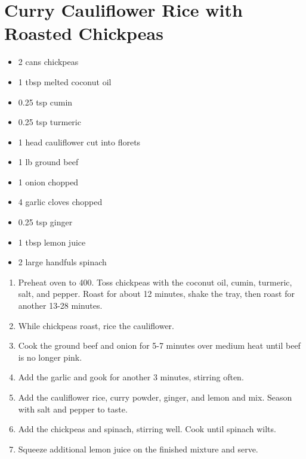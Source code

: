\section{Curry Cauliflower Rice with Roasted Chickpeas}

\begin{itemize}
\item 2 cans chickpeas
\item 1 tbsp melted coconut oil
\item 0.25 tsp cumin
\item 0.25 tsp turmeric
\item 1 head cauliflower cut into florets
\item 1 lb ground beef
\item 1 onion chopped
\item 4 garlic cloves chopped
\item 0.25 tsp ginger
\item 1 tbsp lemon juice
\item 2 large handfuls spinach
\end{itemize}

\begin{enumerate}
\item Preheat oven to 400. Toss chickpeas with the coconut oil, cumin, turmeric, salt, and pepper. Roast
    for about 12 minutes, shake the tray, then roast for another 13-28 minutes.
\item While chickpeas roast, rice the cauliflower.
\item Cook the ground beef and onion for 5-7 minutes over medium heat until beef is no longer pink.
\item Add the garlic and gook for another 3 minutes, stirring often.
\item Add the cauliflower rice, curry powder, ginger, and lemon and mix. Season with salt and pepper to taste.
\item Add the chickpeas and spinach, stirring well. Cook until spinach wilts.
\item Squeeze additional lemon juice on the finished mixture and serve.
\end{enumerate}
